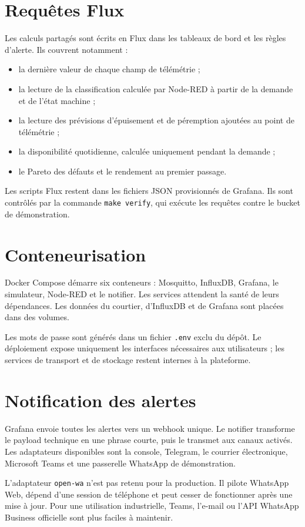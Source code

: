 \section{Requêtes Flux}

Les calculs partagés sont écrits en Flux dans les tableaux de bord et les
règles d'alerte. Ils couvrent notamment :

\begin{itemize}
  \item la dernière valeur de chaque champ de télémétrie ;
  \item la lecture de la classification calculée par Node-RED à partir de la
        demande et de l'état machine ;
  \item la lecture des prévisions d'épuisement et de péremption ajoutées au
        point de télémétrie ;
  \item la disponibilité quotidienne, calculée uniquement pendant la demande ;
  \item le Pareto des défauts et le rendement au premier passage.
\end{itemize}

Les scripts Flux restent dans les fichiers JSON provisionnés de Grafana. Ils
sont contrôlés par la commande \texttt{make verify}, qui exécute les requêtes
contre le bucket de démonstration.

\section{Conteneurisation}

Docker Compose démarre six conteneurs : Mosquitto, InfluxDB, Grafana, le
simulateur, Node-RED et le notifier. Les services attendent la santé de leurs
dépendances. Les données du courtier, d'InfluxDB et de Grafana sont placées
dans des volumes.

Les mots de passe sont générés dans un fichier \texttt{.env} exclu du dépôt.
Le déploiement expose uniquement les interfaces nécessaires aux utilisateurs ;
les services de transport et de stockage restent internes à la plateforme.

\section{Notification des alertes}

Grafana envoie toutes les alertes vers un webhook unique. Le notifier transforme
le payload technique en une phrase courte, puis le transmet aux canaux activés.
Les adaptateurs disponibles sont la console, Telegram, le courrier électronique,
Microsoft Teams et une passerelle WhatsApp de démonstration.

L'adaptateur \texttt{open-wa} n'est pas retenu pour la production. Il pilote
WhatsApp Web, dépend d'une session de téléphone et peut cesser de fonctionner
après une mise à jour. Pour une utilisation industrielle, Teams, l'e-mail ou
l'API WhatsApp Business officielle sont plus faciles à maintenir.
